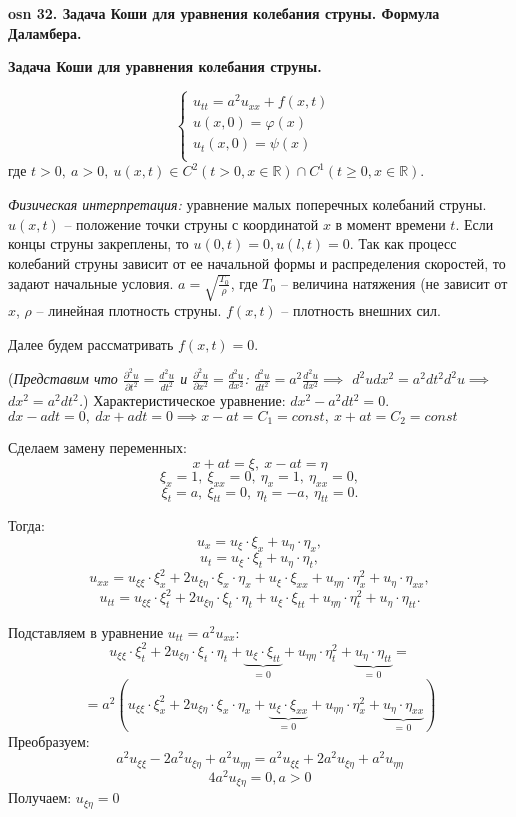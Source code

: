 \textbf{\LARGE osn 32. Задача Коши для уравнения колебания струны. Формула Даламбера.}

\textbf{Задача Коши для уравнения колебания струны.}

$$\begin{cases}
u_{tt}=a^2u_{xx}+f(x,t)&\\
u(x,0)=\varphi(x)&\\
u_t(x,0)=\psi(x)&\\
\end{cases}$$ где $t>0,~a>0,~u(x,t)\in C^2(t > 0, x\in \mathbb{R})\cap C^1(t \geqslant 0, x\in \mathbb{R})$.

\bigbreak
\textit{Физическая интерпретация:} уравнение малых поперечных колебаний струны. $u(x,t)$ -- положение точки струны с координатой $x$ в момент времени $t$. Если концы струны закреплены, то $u(0,t)=0, u(l,t)=0$. Так как процесс колебаний струны зависит от ее начальной формы и распределения скоростей, то задают начальные условия. $a = \sqrt{\frac{T_0}{\rho}}$, где $T_0$ -- величина натяжения (не зависит от $x$, $\rho$ -- линейная плотность струны. $f(x,t)$ -- плотность внешних сил.

\bigbreak
Далее будем рассматривать $f(x,t) = 0$.
\bigbreak

(\textit{Представим что $\frac{\partial^2u}{\partial t^2} = \frac{d^2u}{dt^2}$ и $\frac{\partial^2u}{\partial x^2} = \frac{d^2u}{dx^2}$:
$\frac{d^2u}{dt^2} = a^2\frac{d^2u}{dx^2} \implies$
${d^2udx^2 = a^2dt^2d^2u} \implies$
${dx^2 = a^2dt^2}$.})
Характеристическое уравнение: $dx^2-a^2dt^2=0$. \\
$dx - adt=0, ~ dx+adt = 0 \implies x-at=C_1 = const, ~ x+at=C_2 = const$

Сделаем замену переменных: $$x+at=\xi,~x-at=\eta$$
$$\xi_x=1, ~ \xi_{xx}=0, ~ \eta_x = 1,  ~ \eta_{xx} = 0,$$
$$\xi_t=a, ~ \xi_{tt}=0, ~ \eta_t = -a, ~ \eta_{tt} = 0.$$

Тогда:
$$u_x=u_{\xi}\cdot\xi_x+u_{\eta}\cdot\eta_x,$$
$$u_t=u_{\xi}\cdot\xi_t+u_{\eta}\cdot\eta_t,$$
$$u_{xx}=u_{\xi\xi}\cdot\xi_x^2+2u_{\xi\eta}\cdot\xi_x\cdot\eta_x+u_{\xi}\cdot\xi_{xx}+u_{\eta\eta}\cdot\eta_x^2+u_{\eta}\cdot\eta_{xx},$$
$$u_{tt}=u_{\xi\xi}\cdot\xi_t^2+2u_{\xi\eta}\cdot\xi_t\cdot\eta_t+u_{\xi}\cdot\xi_{tt}+u_{\eta\eta}\cdot\eta_t^2+u_{\eta}\cdot\eta_{tt}.$$

Подставляем в уравнение $u_{tt}=a^2u_{xx}$:
$$u_{\xi\xi}\cdot\xi_t^2+2u_{\xi\eta}\cdot\xi_t\cdot\eta_t+\displaystyle\underbrace{u_{\xi}\cdot\xi_{tt}}_{\text{= 0}}+u_{\eta\eta}\cdot\eta_t^2+\displaystyle\underbrace{u_{\eta}\cdot\eta_{tt}}_{\text{= 0}}=$$ $$=a^2(u_{\xi\xi}\cdot\xi_x^2+2u_{\xi\eta}\cdot\xi_x\cdot\eta_x+\displaystyle\underbrace{u_{\xi}\cdot\xi_{xx}}_{\text{= 0}}+u_{\eta\eta}\cdot\eta_x^2+\displaystyle\underbrace{u_{\eta}\cdot\eta_{xx}}_{\text{= 0}})$$
Преобразуем:
$$a^2u_{\xi\xi}-2a^2u_{\xi\eta}+a^2u_{\eta\eta}=a^2u_{\xi\xi}+2a^2u_{\xi\eta}+a^2u_{\eta\eta}$$
$$4a^2u_{\xi\eta}=0,   a>0$$
Получаем: $u_{\xi\eta}=0$

